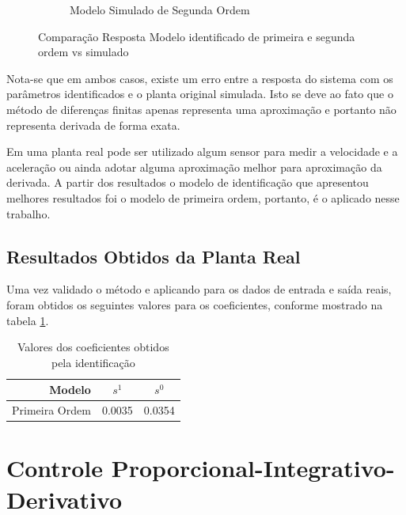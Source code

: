 \documentclass[a4paper,11pt]{article}
\begin{document}
\begin{figure}[H]
\begin{subfigure}[b]{0.5\textwidth}
        \caption{Modelo Simulado de Segunda Ordem}
    \end{subfigure}%
    \caption{Comparação Resposta Modelo identificado de primeira e segunda ordem vs simulado}
    \label{fig:modelEvaluation}
\end{figure}

Nota-se que em ambos casos, existe um erro entre a resposta do sistema com os parâmetros identificados e o planta original simulada. Isto se deve ao fato que o método de diferenças finitas apenas representa uma aproximação e portanto não representa derivada de forma exata.

Em uma planta real pode ser utilizado algum sensor para medir a velocidade e a aceleração ou ainda adotar alguma aproximação melhor para aproximação da derivada. A partir dos resultados o modelo de identificação que apresentou melhores resultados foi o modelo de primeira ordem, portanto, é o aplicado nesse trabalho.


\subsection{Resultados Obtidos da Planta Real}

Uma vez validado o método e aplicando para os dados de entrada e saída reais, foram obtidos os seguintes valores para os coeficientes, conforme mostrado na tabela \ref{tab:tf}.

\begin{table}[H]
    \centering
    \begin{tabular}{r|cc}
    \hline
        Modelo & $s^1$ & $s^0$ \\
     \hline
        Primeira Ordem & 0.0035 & 0.0354 \\
     \hline
    \end{tabular}
    \caption{Valores dos coeficientes obtidos pela identificação}
    \label{tab:tf}
\end{table}


\section{Controle Proporcional-Integrativo-Derivativo}

\end{document}
